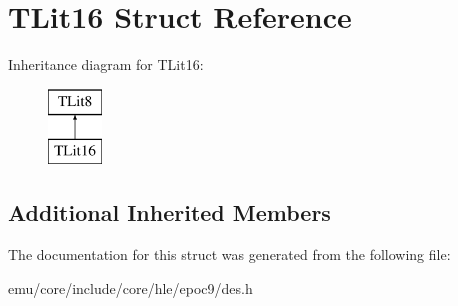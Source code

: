 \hypertarget{struct_t_lit16}{}\section{T\+Lit16 Struct Reference}
\label{struct_t_lit16}
Inheritance diagram for T\+Lit16\+:\begin{figure}[H]
\begin{center}
\leavevmode
\includegraphics[height=2.000000cm]{struct_t_lit16}
\end{center}
\end{figure}
\subsection*{Additional Inherited Members}


The documentation for this struct was generated from the following file\+:\begin{DoxyCompactItemize}
\item 
emu/core/include/core/hle/epoc9/des.\+h\end{DoxyCompactItemize}
